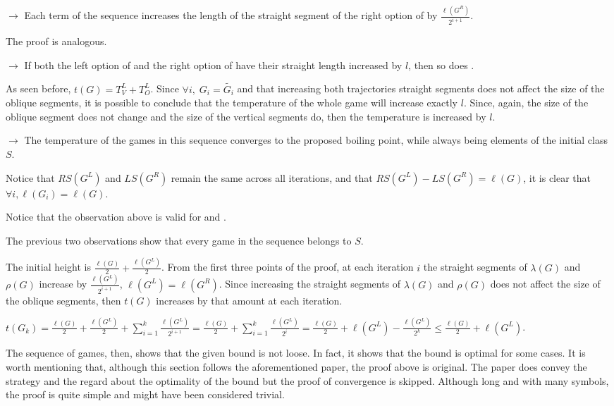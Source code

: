 \begin{list}{}{}
	\item[$\rightarrow$] Each term of the sequence increases the length of the straight segment of the right option of  by $\frac{\ell(G^R)}{2^{i+1}}$.
	\item[ ] The proof is analogous.
	\item[$\rightarrow$] If both the left option of  and the right option of  have their straight length increased by $l$, then so does \Gm{}.
	\item[ ] As seen before, $t(G) = T^L_V + T^L_O$. Since $\forall i,\; G_i = \tilde{G_i}$ and that increasing both trajectories straight segments does not affect the size of the oblique segments, it is possible to conclude that the temperature of the whole game will increase exactly $l$. Since, again, the size of the oblique segment does not change and the size of the vertical segments do, then the temperature is increased by $l$.
	\item[$\rightarrow$] The temperature of the games in this sequence converges to the proposed boiling point, while always being elements of the initial class $S$.
	\item[ ] Notice that $RS(G^L)$ and $LS(G^R)$ remain the same across all iterations, and that $RS(G^L) - LS(G^R) = \ell(G)$, it is clear that $\forall i, \ell(G_i) = \ell(G)$.
	\item[ ] Notice that the observation above is valid for  and .
	\item[ ] The previous two observations show that every game in the sequence belongs to $S$.
	\item[ ] The initial height is $\frac{\ell(G)}{2} + \frac{\ell(G^L)}{2}$. From the first three points of the proof, at each iteration $i$ the straight segments of $\lambda(G)$ and $\rho(G)$ increase by $\frac{\ell(G^L)}{2^{i+1}}$, $\ell(G^L) = \ell(G^R)$. Since increasing the straight segments of $\lambda(G)$ and $\rho(G)$ does not affect the size of the oblique segments, then $t(G)$ increases by that amount at each iteration.
	\item[] \hspace{-1cm} $t(G_k) = \frac{\ell(G)}{2} + \frac{\ell(G^L)}{2} + \sum\limits_{i=1}^{k} \frac{\ell(G^L)}{2^{i+1}} = \frac{\ell(G)}{2} + \sum\limits_{i=1}^{k} \frac{\ell(G^L)}{2^{i}} = \frac{\ell(G)}{2} + \ell(G^L) - \frac{\ell(G^L)}{2^k} \leq \frac{\ell(G)}{2} + \ell(G^L)$.
\end{list}

The sequence of games, then, shows that the given bound is not loose. In fact, it shows that the bound is optimal for some cases. It is worth mentioning that, although this section follows the aforementioned paper, the proof above is original. The paper does convey the strategy and the regard about the optimality of the bound but the proof of convergence is skipped. Although long and with many symbols, the proof is quite simple and might have been considered trivial.

